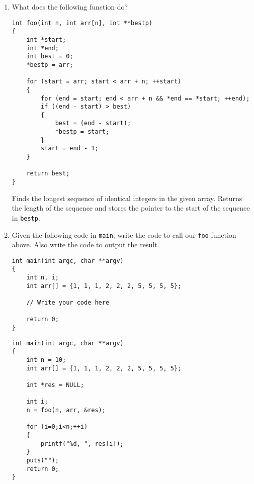 \begin{enumerate}
\item What does the following function do?

\begin{lstlisting}
int foo(int n, int arr[n], int **bestp)
{
	int *start;
	int *end;
	int best = 0;
	*bestp = arr;
	
	for (start = arr; start < arr + n; ++start)
	{
		for (end = start; end < arr + n && *end == *start; ++end);
		if ((end - start) > best)
		{
			best = (end - start);
			*bestp = start;
		}
		start = end - 1;
	}
	
	return best;
}
\end{lstlisting}

\begin{answer}
Finds the longest sequence of identical integers in the given array.
Returns the length of the sequence and stores the pointer to the start of the sequence in \texttt{bestp}.
\end{answer}

\item Given the following code in \texttt{main}, write the code to call our \texttt{foo} function above.
Also write the code to output the result.
\begin{lstlisting}
int main(int argc, char **argv)
{
	int n, i;
	int arr[] = {1, 1, 1, 2, 2, 2, 5, 5, 5, 5};

	// Write your code here

	return 0;
}
\end{lstlisting}

\begin{answer}
\begin{lstlisting}
int main(int argc, char **argv)
{
	int n = 10;
	int arr[] = {1, 1, 1, 2, 2, 2, 5, 5, 5, 5};

	int *res = NULL;

	int i;
	n = foo(n, arr, &res);

	for (i=0;i<n;++i)
	{
		printf("%d, ", res[i]);
	}
	puts("");
	return 0;
}
\end{lstlisting}
\end{answer}
\end{enumerate}
